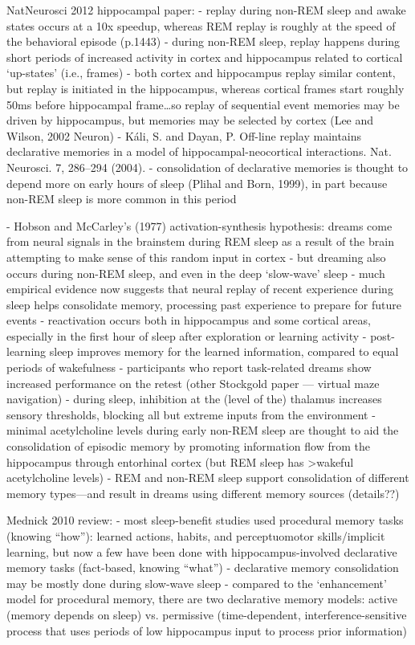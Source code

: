 \documentclass[10pt,letterpaper]{article}
\begin{document}
NatNeurosci 2012 hippocampal paper: 
	- replay during non-REM sleep and awake states occurs at a 10x speedup, whereas REM replay is roughly at the speed of the behavioral episode (p.1443)
	- during non-REM sleep, replay happens during short periods of increased activity in cortex and hippocampus related to cortical ‘up-states’ (i.e., frames)
	- both cortex and hippocampus replay similar content, but replay is initiated in the hippocampus, whereas cortical frames start roughly 50ms before hippocampal frame…so replay of sequential event memories may be driven by hippocampus, but memories may be selected by cortex (Lee and Wilson, 2002 Neuron)
	- Káli, S. and Dayan, P. Off-line replay maintains declarative memories in a model of hippocampal-neocortical interactions. Nat. Neurosci. 7, 286–294 (2004).
	- consolidation of declarative memories is thought to depend more on early hours of sleep (Plihal and Born, 1999), in part because non-REM sleep is more common in this period

	- Hobson and McCarley’s (1977) activation-synthesis hypothesis: dreams come from neural signals in the brainstem during REM sleep as a result of the brain attempting to make sense of this random input in cortex
	- but dreaming also occurs during non-REM sleep, and even in the deep ‘slow-wave’ sleep
	- much empirical evidence now suggests that neural replay of recent experience during sleep helps consolidate memory, processing past experience to prepare for future events
	- reactivation occurs both in hippocampus and some cortical areas, especially in the first hour of sleep after exploration or learning activity
	- post-learning sleep improves memory for the learned information, compared to equal periods of wakefulness
	- participants who report task-related dreams show increased performance on the retest (other Stockgold paper — virtual maze navigation)
	- during sleep, inhibition at the (level of the) thalamus increases sensory thresholds, blocking all but extreme inputs from the environment
	- minimal acetylcholine levels during early non-REM sleep are thought to aid the consolidation of episodic memory by promoting information flow from the hippocampus through entorhinal cortex (but REM sleep has >wakeful acetylcholine levels)
	- REM and non-REM sleep support consolidation of different memory types—and result in dreams using different memory sources (details??)

Mednick 2010 review:
	- most sleep-benefit studies used procedural memory tasks (knowing “how”): learned actions, habits, and perceptuomotor skills/implicit learning, but now a few have been done with hippocampus-involved declarative memory tasks (fact-based, knowing “what”)
	- declarative memory consolidation may be mostly done during slow-wave sleep
	- compared to the ‘enhancement’ model for procedural memory, there are two declarative memory models: active (memory depends on sleep) vs. permissive (time-dependent, interference-sensitive process that uses periods of low hippocampus input to process prior information)
\end{document}
